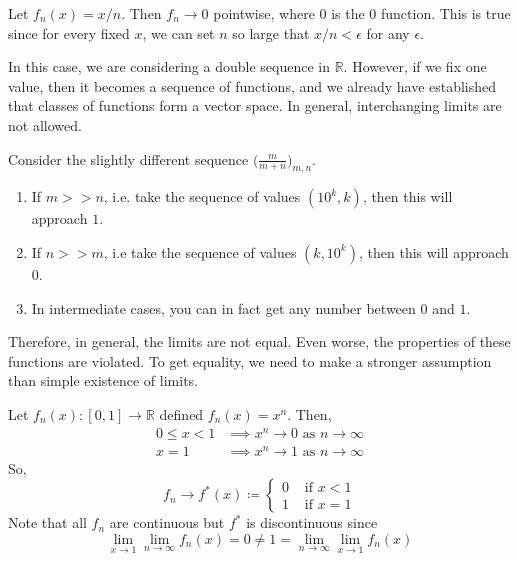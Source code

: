   \begin{example}
    Let $f_n (x) = x/n$. Then $f_n \to 0$ pointwise, where $0$ is the $0$ function. This is true since for every fixed $x$, we can set $n$ so large that $x/n < \epsilon$ for any $\epsilon$. 
  \end{example}

  In this case, we are considering a double sequence in $\mathbb{R}$. However, if we fix one value, then it becomes a sequence of functions, and we already have established that classes of functions form a vector space. In general, interchanging limits are not allowed. 

  \begin{example}
    Consider the slightly different sequence $\big( \frac{m}{m + n} \big)_{m, n}$. 
    \begin{enumerate}
      \item If $m >> n$, i.e. take the sequence of values $(10^k, k)$, then this will approach $1$. 
      \item If $n >> m$, i.e take the sequence of values $(k, 10^k)$, then this will approach $0$. 
      \item In intermediate cases, you can in fact get any number between $0$ and $1$. 
    \end{enumerate}
  \end{example}

  Therefore, in general, the limits are not equal. Even worse, the properties of these functions are violated. To get equality, we need to make a stronger assumption than simple existence of limits. 

  \begin{example}
    Let $f_n (x) : [0, 1] \to \mathbb{R}$  defined $f_n (x) = x^n$. Then, 
    \begin{align}
      0 \leq x < 1 & \implies x^n \to 0 \text{ as } n \to \infty \\ 
      x = 1 & \implies x^n \to 1 \text{ as } n \to \infty
    \end{align}
    So, 
    \begin{equation}
      f_n \to f^\ast (x) \coloneqq \begin{cases} 
        0 & \text{ if } x < 1 \\ 
        1 & \text{ if } x = 1
      \end{cases}
    \end{equation}
    Note that all $f_n$ are continuous but $f^\ast$ is discontinuous since 
    \begin{equation}
      \lim_{x \to 1} \lim_{n \to \infty} f_n (x) = 0 \neq 1 = \lim_{n \to \infty} \lim_{x \to 1} f_n (x)
    \end{equation}
  \end{example}

